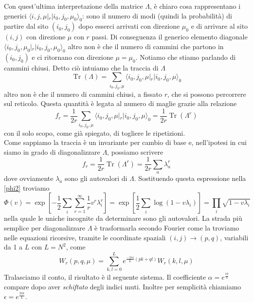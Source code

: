 \documentclass[11pt]{article}
\DeclareMathOperator{\Tr}{Tr}
\DeclareMathOperator{\Exp}{exp}
\DeclareMathOperator{\Log}{log}
\begin{document}
Con quest'ultima interpretazione della matrice $\Lambda$, è chiaro cosa rappresentano i generici $\langle i,j,\mu|_r |i_0,j_0,\mu_0\rangle_0$: sono il numero di modi (quindi la probabilità) di partire dal sito $(i_0,j_0)$ dopo esserci arrivati con direzione $\mu_0$ e di arrivare al sito $(i,j)$ con direzione $\mu$ con $r$ passi. Di conseguenza il generico elemento diagonale $\langle i_0,j_0,\mu_0|_r |i_0,j_0,\mu_0\rangle_0$ altro non è che il numero di cammini che partono in $(i_0,j_0)$ e ci ritornano con direzione $\mu=\mu_0$. Notiamo che stiamo parlando di cammini chiusi.
Detto ciò intuiamo che la traccia di $\Lambda$
$$ \Tr{(\Lambda)}=\sum_{i_0,j_0,\mu} \langle i_0,j_0,\mu|_r |i_0,j_0,\mu\rangle_0
$$ altro non è che il numero di cammini chiusi, a fissato $r$, che si possono percorrere sul reticolo. Questa quantità è legata al numero di maglie grazie alla relazione
\begin{equation}
f_r=\frac{1}{2r}\sum_{i_0,j_0,\mu} \langle i_0,j_0,\mu|_r |i_0,j_0,\mu\rangle_0=\frac{1}{2r}\Tr{(\Lambda^r)}
\end{equation}
con il solo scopo, come già spiegato, di togliere le ripetizioni.\\
Come sappiamo la traccia è un invariante per cambio di base e, nell'ipotesi in cui siamo in grado di diagonalizzare $\Lambda$, possiamo scrivere
\begin{equation}\label{autovalori}
 f_r=\frac{1}{2r}\Tr{(\Lambda^r)}=\frac{1}{2r}\sum_a \lambda_a^r
\end{equation}
dove ovviamente $\lambda_a$ sono gli autovalori di $\Lambda$. Sostituendo questa espressione nella \ref{phi2} troviamo
\begin{equation}\label{prod}
\Phi(v)= \Exp \left [ -\frac{1}{2}\sum_i\sum_{r=1}^\infty\frac{1}{r}v^r\lambda_i^r \right ] = \Exp \left [ \frac{1}{2} \sum_i \Log (1-v\lambda_i) \right]= \prod_i \sqrt{1-v\lambda_i}
\end{equation}
nella quale le uniche incognite da determinare sono gli autovalori.
La strada più semplice per diagonalizzare $\Lambda$ è trasformarla secondo Fourier come la troviamo nelle equazioni ricorsive, tramite le coordinate spaziali $(i,j) \to (p,q)$, variabili da 1 a $L$ con $L=N^2$, come
\begin{equation}\label{trasformata}
W_r(p,q,\mu)=\sum_{k,l=0}^L e^{\frac{-2\pi i}{L}(pk+ql)}W_r(k,l,\mu)
\end{equation} 
Tralasciamo il conto, il risultato è il seguente sistema. Il coefficiente $\alpha=e^{\frac{i\phi}{4}}$ compare dopo aver \emph{schiftato} degli indici muti. Inoltre per semplicità chiamiamo $\epsilon=e^{\frac{2\phi i}{L}}$.
\end{document}
